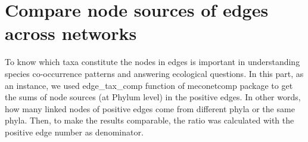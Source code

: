 \documentclass[
]{book}
\newenvironment{Shaded}{\begin{snugshade}}{\end{snugshade}}
\newcommand{\AttributeTok}[1]{\textcolor[rgb]{0.13,0.29,0.53}{#1}}
\newcommand{\CommentTok}[1]{\textcolor[rgb]{0.56,0.35,0.01}{\textit{#1}}}
\newcommand{\ConstantTok}[1]{\textcolor[rgb]{0.56,0.35,0.01}{#1}}
\newcommand{\DecValTok}[1]{\textcolor[rgb]{0.00,0.00,0.81}{#1}}
\newcommand{\FunctionTok}[1]{\textcolor[rgb]{0.13,0.29,0.53}{\textbf{#1}}}
\newcommand{\NormalTok}[1]{#1}
\newcommand{\OtherTok}[1]{\textcolor[rgb]{0.56,0.35,0.01}{#1}}
\newcommand{\SpecialCharTok}[1]{\textcolor[rgb]{0.81,0.36,0.00}{\textbf{#1}}}
\newcommand{\StringTok}[1]{\textcolor[rgb]{0.31,0.60,0.02}{#1}}
\newcounter{none} %
\begin{document}
\begin{Shaded}
\end{Shaded}

\section{Compare node sources of edges across networks}\label{compare-node-sources-of-edges-across-networks}

To know which taxa constitute the nodes in edges is important in understanding species co-occurrence patterns and answering ecological questions.
In this part, as an instance, we used edge\_tax\_comp function of meconetcomp package to get the sums of node sources (at Phylum level) in the positive edges.
In other words, how many linked nodes of positive edges come from different phyla or the same phyla.
Then, to make the results comparable, the ratio was calculated with the positive edge number as denominator.
\end{document}
